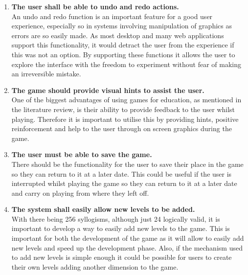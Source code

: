 \documentclass[12pt,a4paper]{report}
\begin{document}
\begin{enumerate}[label*=\arabic*]
            
            	  \item \textbf{The user shall be able to undo and redo actions.}\\
An undo and redo function is an important feature for a good user experience, especially so in systems involving manipulation of graphics as errors are so easily made. As most desktop and many web applications support this functionality, it would detract the user from the experience if this was not an option. By supporting these functions it allows the user to explore the interface with the freedom to experiment without fear of making an irreversible mistake. 
            
            
            	  \item \textbf{The game should provide visual hints to assist the user.}\\
One of the biggest advantages of using games for education, as mentioned in the literature review, is their ability to provide feedback to the user whilst playing. Therefore it is important to utilise this by providing hints, positive reinforcement and help to the user through on screen graphics during the game.

            	  \item \textbf{The user must be able to save the game.}\\
There should be the functionality for the user to save their place in the game so they can return to it at a later date. This could be useful if the user is interrupted whilst playing the game so they can return to it at a later date and carry on playing from where they left off.
            
                        	  \item \textbf{The system shall easily allow new levels to be added.}\\
With there being 256 syllogisms, although just 24 logically valid, it is important to develop a way to easily add new levels to the game. This is important for both the development of the game as it will allow to easily add new levels and speed up the development phase. Also, if the mechanism used to add new levels is simple enough it could be possible for users to create their own levels adding another dimension to the game.

            
            
        \end{enumerate}
        
\end{document}
